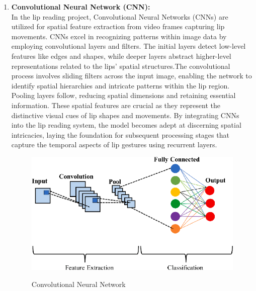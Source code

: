 \begin{enumerate}
\begin{figure}[h]
	\end{figure}
	\pagebreak
	\item \textbf{Convolutional Neural Network (CNN):}
	\\In the lip reading project, Convolutional Neural Networks (CNNs) are utilized for spatial feature extraction from video frames capturing lip movements. CNNs excel in recognizing patterns within image data by employing convolutional layers and filters. The initial layers detect low-level features like edges and shapes, while deeper layers abstract higher-level representations related to the lips' spatial structures.The convolutional process involves sliding filters across the input image, enabling the network to identify spatial hierarchies and intricate patterns within the lip region. Pooling layers follow, reducing spatial dimensions and retaining essential information. These spatial features are crucial as they represent the distinctive visual cues of lip shapes and movements. By integrating CNNs into the lip reading system, the model becomes adept at discerning spatial intricacies, laying the foundation for subsequent processing stages that capture the temporal aspects of lip gestures using recurrent layers.
	
	
	\begin{figure}[h]
	\centering
	\includegraphics[scale=1.1]{img/CNN.png}
     \cite{google}
	\caption{Convolutional Neural Network}
	

\end{figure}
\end{enumerate}
